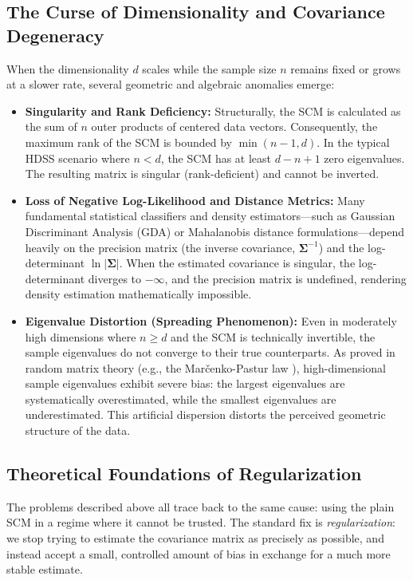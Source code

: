 \subsection{The Curse of Dimensionality and Covariance Degeneracy}

When the dimensionality $d$ scales while the sample size $n$ remains fixed or grows at a slower rate, several geometric and algebraic anomalies emerge:

\begin{itemize}
	\item \textbf{Singularity and Rank Deficiency:} Structurally, the SCM is calculated as the sum of $n$ outer products of centered data vectors. Consequently, the maximum rank of the SCM is bounded by $\min(n-1, d)$. In the typical HDSS scenario where $n < d$, the SCM has at least $d - n + 1$ zero eigenvalues. The resulting matrix is singular (rank-deficient) and cannot be inverted.

	\item \textbf{Loss of Negative Log-Likelihood and Distance Metrics:} Many fundamental statistical classifiers and density estimators—such as Gaussian Discriminant Analysis (GDA) or Mahalanobis distance formulations—depend heavily on the precision matrix (the inverse covariance, $\boldsymbol{\Sigma}^{-1}$) and the log-determinant $\ln|\boldsymbol{\Sigma}|$. When the estimated covariance is singular, the log-determinant diverges to $-\infty$, and the precision matrix is undefined, rendering density estimation mathematically impossible.

	\item \textbf{Eigenvalue Distortion (Spreading Phenomenon):} Even in moderately high dimensions where $n \ge d$ and the SCM is technically invertible, the sample eigenvalues do not converge to their true counterparts. As proved in random matrix theory (e.g., the Marčenko-Pastur law \cite{MarPas67}), high-dimensional sample eigenvalues exhibit severe bias: the largest eigenvalues are systematically overestimated, while the smallest eigenvalues are underestimated. This artificial dispersion distorts the perceived geometric structure of the data.
\end{itemize}

\subsection{Theoretical Foundations of Regularization}

The problems described above all trace back to the same cause: using the plain SCM in a regime where it cannot be trusted. The standard fix is \textit{regularization}: we stop trying to estimate the covariance matrix as precisely as possible, and instead accept a small, controlled amount of bias in exchange for a much more stable estimate.


